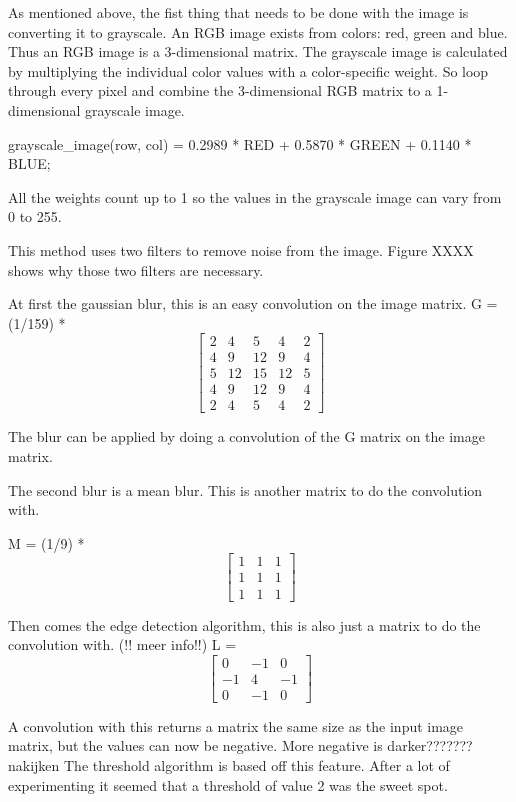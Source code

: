 \documentclass{article}
\begin{document}
As mentioned above, the fist thing that needs to be done with the image is converting it to grayscale. An RGB image exists from colors: red, green and blue. Thus an RGB image is a 3-dimensional matrix. The grayscale image is calculated by multiplying the individual color values with a color-specific weight. So loop through every pixel and combine the 3-dimensional RGB matrix to a 1-dimensional grayscale image.

grayscale_image(row, col) = 0.2989 * RED + 0.5870 * GREEN + 0.1140 * BLUE;  

All the weights count up to 1 so the values in the grayscale image can vary from 0 to 255.

This method uses two filters to remove noise from the image. 
Figure XXXX shows why those two filters are necessary.

At first the gaussian blur, this is an easy convolution on the image matrix.
G = (1/159) * \[
\begin{bmatrix}
    2 & 4 & 5 & 4 & 2\\
    4 & 9 & 12 & 9 &4\\
    5 & 12 &15&12&5\\
    4&9&12&9&4\\
    2&4&5&4&2
\end{bmatrix}
\]

The blur can be applied by doing a convolution of the G matrix on the image matrix.

The second blur is a mean blur. This is another matrix to do the convolution with.

M = (1/9) * \[
\begin{bmatrix}
	1&1&1\\
	1&1&1\\
	1&1&1
\end{bmatrix}
\]

Then comes the edge detection algorithm, this is also just a matrix to do the convolution with.
(!! meer info!!)
L = \[
\begin{bmatrix}
	0&-1&0\\
	-1&4&-1\\
	0&-1&0
\end{bmatrix}
\]

A convolution with this returns a matrix the same size as the input image matrix, but the values can now be negative. More negative is darker??????? nakijken
The threshold algorithm is based off this feature. After a lot of experimenting it seemed that a threshold of value 2 was the sweet spot.
\end{document}
